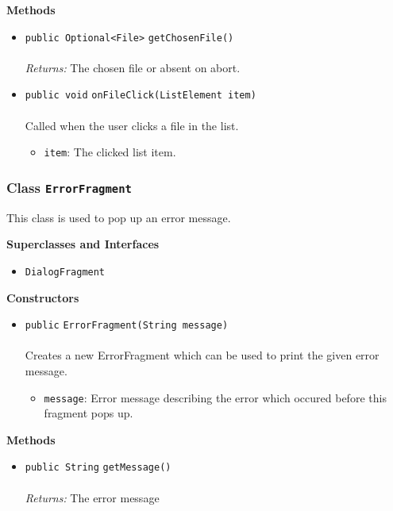 \textbf{\sffamily Methods}
\begin{itemize}
\item \lstinline|public Optional<File>| \lstinline|getChosenFile|\lstinline|()|\\ \\[-0.6em]
\emph{Returns:} The chosen file or absent on abort.



\item \lstinline|public void| \lstinline|onFileClick|\lstinline|(ListElement item)|\\ \\[-0.6em]
Called when the user clicks a file in the list.
\begin{itemize}
\item \lstinline|item|: The clicked list item.
\end{itemize}



\end{itemize}

\subsubsection{Class \lstinline|ErrorFragment|}
This class is used to pop up an error message. \\
\noindent\begin{minipage}[t]{5cm}
\vspace{0.3em}
\hspace*{2em}
\vspace{0.3em}
\end{minipage}



\textbf{\sffamily Superclasses and Interfaces}
\begin{itemize}
\item \lstinline|DialogFragment|
\end{itemize}


\textbf{\sffamily Constructors}
\begin{itemize}
\item \lstinline|public| \lstinline|ErrorFragment|\lstinline|(String message)|\\ \\[-0.6em]
Creates a new ErrorFragment which can be used to print the given error message.
\begin{itemize}
\item \lstinline|message|: Error message describing the error which occured before this fragment pops up.
\end{itemize}



\end{itemize}


\textbf{\sffamily Methods}
\begin{itemize}
\item \lstinline|public String| \lstinline|getMessage|\lstinline|()|\\ \\[-0.6em]
\emph{Returns:} The error message



\end{itemize}


